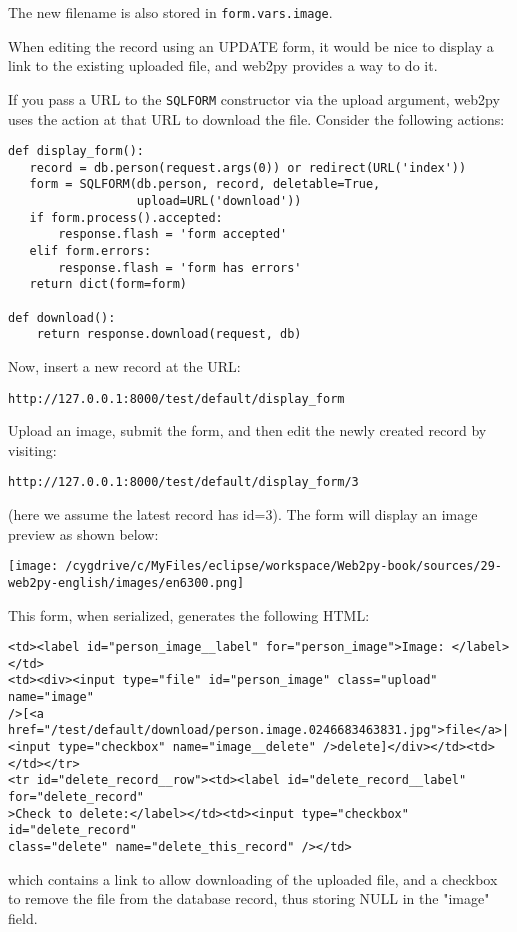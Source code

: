 \documentclass[justified,sixbynine,notoc]{tufte-book}
\def\ft{\small\tt}
\begin{document}
\begin{fullwidth}
The new filename is also stored in {\ft form.vars.image}.

When editing the record using an UPDATE form, it would be nice to display a link to the existing uploaded file, and web2py provides a way to do it.

If you pass a URL to the {\ft SQLFORM} constructor via the upload argument, web2py uses the action at that URL to download the file. Consider the following actions:
\begin{lstlisting}
def display_form():
   record = db.person(request.args(0)) or redirect(URL('index'))
   form = SQLFORM(db.person, record, deletable=True,
                  upload=URL('download'))
   if form.process().accepted:
       response.flash = 'form accepted'
   elif form.errors:
       response.flash = 'form has errors'
   return dict(form=form)

def download():
    return response.download(request, db)
\end{lstlisting}

Now, insert a new record at the URL:
\begin{lstlisting}[keywords={}]
http://127.0.0.1:8000/test/default/display_form
\end{lstlisting}

Upload an image, submit the form, and then edit the newly created record
by visiting:
\begin{lstlisting}[keywords={}]
http://127.0.0.1:8000/test/default/display_form/3
\end{lstlisting}

(here we assume the latest record has id=3). The form will display an image preview as shown below:


\goodbreak\begin{center}\texttt{[image: /cygdrive/c/MyFiles/eclipse/workspace/Web2py-book/sources/29-web2py-english/images/en6300.png]}\end{center}


This form, when serialized, generates the following HTML:
\begin{lstlisting}[keywords={}]
<td><label id="person_image__label" for="person_image">Image: </label></td>
<td><div><input type="file" id="person_image" class="upload" name="image"
/>[<a href="/test/default/download/person.image.0246683463831.jpg">file</a>|
<input type="checkbox" name="image__delete" />delete]</div></td><td></td></tr>
<tr id="delete_record__row"><td><label id="delete_record__label" for="delete_record"
>Check to delete:</label></td><td><input type="checkbox" id="delete_record"
class="delete" name="delete_this_record" /></td>
\end{lstlisting}
\noindent which contains a link to allow downloading of the uploaded file, and a checkbox to remove the file from the database record, thus storing NULL in the "image" field.


\end{fullwidth}
\end{document}
